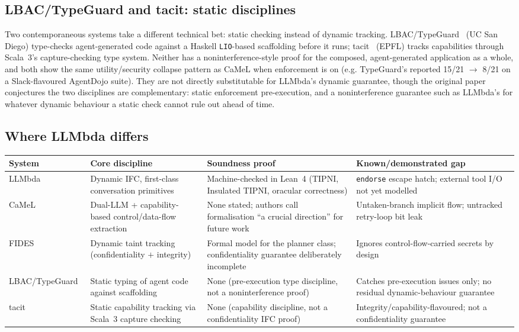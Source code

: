 \documentclass[11pt, a4paper]{article}
\begin{document}
\begin{descirption}
{\subsection{LBAC/TypeGuard and tacit: static disciplines}

Two contemporaneous systems take a different technical bet: static
checking instead of dynamic tracking. LBAC/TypeGuard~\cite{lbac} (UC San
Diego) type-checks agent-generated code against a Haskell
\texttt{LIO}-based scaffolding before it runs; tacit~\cite{tacit} (EPFL)
tracks capabilities through Scala~3's capture-checking type system.
Neither has a noninterference-style proof for the composed,
agent-generated application as a whole, and both show the same
utility/security collapse pattern as CaMeL when enforcement is on (e.g.
TypeGuard's reported 15/21 $\rightarrow$ 8/21 on a Slack-flavoured
AgentDojo suite). They are not directly substitutable for LLMbda's
dynamic guarantee, though the original paper conjectures the two
disciplines are complementary: static enforcement pre-execution, and a
noninterference guarantee such as LLMbda's for whatever dynamic
behaviour a static check cannot rule out ahead of time.

\subsection{Where LLMbda differs}

\begin{center}
\small
\begin{tabular}{@{}p{2.6cm}p{3.1cm}p{3.4cm}p{4.2cm}@{}}
\toprule
System & Core discipline & Soundness proof & Known/demonstrated gap \\
\midrule
LLMbda & Dynamic IFC, first-class conversation primitives &
Machine-checked in Lean~4 (TIPNI, Insulated TIPNI, oracular
correctness) & \lstinline{endorse} escape hatch; external tool I/O not
yet modelled \\
CaMeL~\cite{camel} & Dual-LLM + capability-based control/data-flow
extraction & None stated; authors call formalisation ``a crucial
direction'' for future work & Untaken-branch implicit flow;
untracked retry-loop bit leak \\
FIDES~\cite{fides} & Dynamic taint tracking (confidentiality $+$
integrity) & Formal model for the planner class; confidentiality
guarantee deliberately incomplete & Ignores control-flow-carried
secrets by design \\
LBAC/\allowbreak TypeGuard~\cite{lbac} & Static typing of agent code against
scaffolding & None (pre-execution type discipline, not a
noninterference proof) & Catches pre-execution issues only; no
residual dynamic-behaviour guarantee \\
tacit~\cite{tacit} & Static capability tracking via Scala~3 capture
checking & None (capability discipline, not a confidentiality IFC
proof) & Integrity/capability-flavoured; not a confidentiality
guarantee \\
\bottomrule
\end{tabular}
\end{center}

}
\end{descirption}
\end{document}
